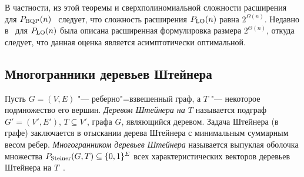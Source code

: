 В частности, из этой теоремы и сверхполиномиальной сложности расширения для $P_{\textup{BQP}}(n)$~\cite{FioriniPokutta:2015} следует, что сложность расширения $P_{\textup{LO}}(n)$ равна $2^{\Omega(n)}$. Недавно в~\cite{Davis:2018} для $P_{\textup{LO}}(n)$ была описана расширенная формулировка размера $2^{\Theta(n)}$, откуда следует, что данная оценка является асимптотически оптимальной.



\subsection{Многогранники деревьев Штейнера}
\label{sec:SteinerTree}

Пусть $G=(V,E)$ "--- реберно"=взвешенный граф, а $T$ "--- некоторое подмножество его вершин. \emph{Деревом Штейнера на $T$} называется подграф $G' = (V',E')$, $T\subseteq V'$, графа $G$, являющийся деревом. Задача Штейнера (в графе) заключается в отыскании дерева Штейнера с минимальным суммарным весом ребер.
\emph{Многогранником деревьев Штейнера} называется выпуклая оболочка множества $P_{\textup{Steiner}}(G,T) \subseteq \{0,1\}^E$ всех характеристических векторов деревьев Штейнера на $T$~\cite{Chopra:1994}.

